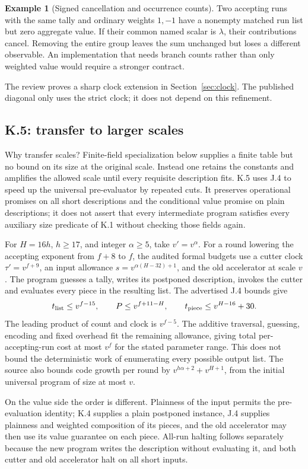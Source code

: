 \documentclass[11pt,letterpaper]{article}
\theoremstyle{definition}\newtheorem{definition}[theorem]{Definition}\newtheorem{example}[theorem]{Example}
\theoremstyle{remark}\newtheorem{remark}[theorem]{Remark}
\begin{document}
\begin{example}[Signed cancellation and occurrence counts]
Two accepting runs with the same tally and ordinary weights $1,-1$ have a nonempty matched run list but zero aggregate value. If their common named scalar is $\lambda$, their contributions cancel. Removing the entire group leaves the sum unchanged but loses a different observable. An implementation that needs branch counts rather than only weighted value would require a stronger contract.
\end{example}
The review proves a sharp clock extension in Section~\ref{sec:clock}. The published diagonal only uses the strict clock; it does not depend on this refinement.

\subsection{K.5: transfer to larger scales}\label{sec:scale}
Why transfer scales? Finite-field specialization below supplies a finite table but no bound on its size at the original scale. Instead one retains the constants and amplifies the allowed scale until every requisite description fits. K.5 uses J.4 to speed up the universal pre-evaluator by repeated cuts. It preserves operational promises on all short descriptions and the conditional value promise on plain descriptions; it does not assert that every intermediate program satisfies every auxiliary size predicate of K.1 without checking those fields again.

For $H=16h$, $h\ge17$, and integer $\alpha\ge5$, take $v'=v^\alpha$. For a round lowering the accepting exponent from $f+8$ to $f$, the audited formal budgets use a cutter clock $\tau'=v^{f+9}$, an input allowance $s=v^{\alpha(H-32)+1}$, and the old accelerator at scale $v$. The program guesses a tally, writes its postponed description, invokes the cutter and evaluates every piece in the resulting list. The advertised J.4 bounds give
\[
 t_{\rm list}\le v^{f-15},\qquad
 P\le v^{f+11-H},\qquad
 t_{\rm piece}\le v^{H-16}+30.
\]
The leading product of count and clock is $v^{f-5}$. The additive traversal, guessing, encoding and fixed overhead fit the remaining allowance, giving total per-accepting-run cost at most $v^f$ for the stated parameter range. This does not bound the deterministic work of enumerating every possible output list. The source also bounds code growth per round by $v^{h\alpha+2}+v^{H+1}$, from the initial universal program of size at most $v$.

On the value side the order is different. Plainness of the input permits the pre-evaluation identity; K.4 supplies a plain postponed instance, J.4 supplies plainness and weighted composition of its pieces, and the old accelerator may then use its value guarantee on each piece. All-run halting follows separately because the new program writes the description without evaluating it, and both cutter and old accelerator halt on all short inputs.
\end{document}
